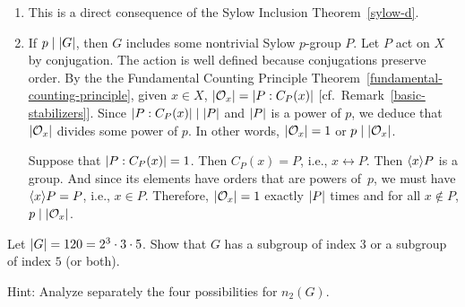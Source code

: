 \begin{solution}
\begin{enumerate}[\rm a)]
    \item This is a direct consequence of the Sylow Inclusion Theorem~\ref{sylow-d}.

    \item If $p\mid\left\vert{G}\right\vert$, then $G$ includes some nontrivial Sylow $p$-group $P$. Let $P$ act on $X$ by conjugation. The action is well defined because conjugations preserve order. By the the Fundamental Counting Principle Theorem~\ref{fundamental-counting-principle}, given $x\in X$, $|{\cal O}_x|=\left\vert{P:C_P(x)}\right\vert$ [cf.~Remark~\ref{basic-stabilizers}]. Since $\left\vert{P:C_P(x)}\right\vert\mid\left\vert{P}\right\vert$ and $\left\vert{P}\right\vert$ is a power of $p$, we deduce that $\left\vert{{\cal O}_x}\right\vert$ divides some power of $p$. In other words, $\left\vert{{\cal O}_x}\right\vert=1$ or $p\mid \left\vert{{\cal O}_x}\right\vert$.
    
    Suppose that $\left\vert{P:C_P(x)}\right\vert=1$. Then $C_P(x)=P$, i.e., $x\leftrightarrow P$. Then $\langle x\rangle P$ is a group. And since its elements have orders that are powers of~$p$, we must have $\langle x\rangle P=P$, i.e., $x\in P$. Therefore, $\left\vert{{\cal O}_x}\right\vert=1$ exactly $\left\vert{P}\right\vert$ times and for all $x\notin P$, $p\mid\left\vert{{\cal O}_x}\right\vert$.
\end{enumerate}
\end{solution}

\begin{probl}
    Let $\left\vert{G}\right\vert = 120 = 2^3 \cdot 3 \cdot 5$. Show that $G$ has a subgroup of index $3$ or a subgroup of index\/ $5$ (or both).

    \textrm{\rm Hint: Analyze separately the four possibilities for $n_2(G)$}.
\end{probl}

